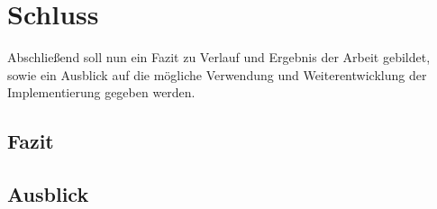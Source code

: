 \chapter{Schluss} \label{Schluss}
Abschließend soll nun ein Fazit zu Verlauf und Ergebnis der Arbeit gebildet,
sowie ein Ausblick auf die mögliche Verwendung und Weiterentwicklung
der Implementierung gegeben werden.

\section{Fazit} \label{Fazit}

\section{Ausblick} \label{Ausblick}
